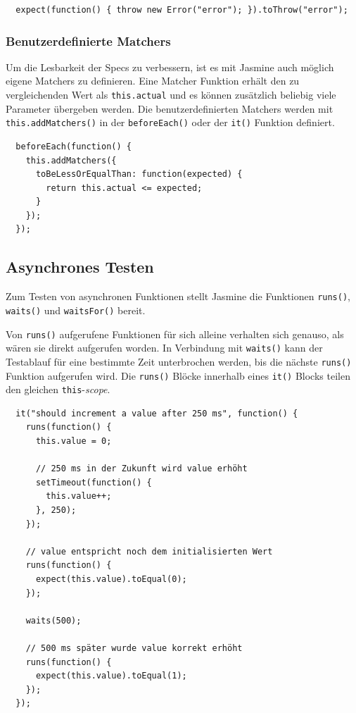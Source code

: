 \documentclass[11pt, a4paper]{article}
\begin{document}
\begin{verbatim}
  expect(function() { throw new Error("error"); }).toThrow("error");
\end{verbatim}

\subsubsection*{Benutzerdefinierte Matchers}

Um die Lesbarkeit der Specs zu verbessern, ist es mit Jasmine auch möglich eigene
Matchers zu definieren. Eine Matcher Funktion erhält den zu vergleichenden Wert
als \texttt{this.actual} und es können zusätzlich beliebig viele Parameter
übergeben werden. Die benutzerdefinierten Matchers werden mit
\texttt{this.addMatchers()} in der \texttt{beforeEach()} oder der \texttt{it()}
Funktion definiert.

\begin{verbatim}
  beforeEach(function() {
    this.addMatchers({
      toBeLessOrEqualThan: function(expected) {
        return this.actual <= expected;
      }
    });
  });
\end{verbatim}

\subsection{Asynchrones Testen}

Zum Testen von asynchronen Funktionen stellt Jasmine die Funktionen
\texttt{runs()}, \texttt{waits()} und \texttt{waitsFor()} bereit.

Von \texttt{runs()} aufgerufene Funktionen für sich alleine verhalten sich
genauso, als wären sie direkt aufgerufen worden. In Verbindung mit
\texttt{waits()} kann der Testablauf für eine bestimmte Zeit unterbrochen
werden, bis die nächste \texttt{runs()} Funktion aufgerufen wird. Die
\texttt{runs()} Blöcke innerhalb eines \texttt{it()} Blocks teilen den gleichen
\texttt{this}-\emph{scope}.

\begin{verbatim}
  it("should increment a value after 250 ms", function() {
    runs(function() {
      this.value = 0;

      // 250 ms in der Zukunft wird value erhöht
      setTimeout(function() {
        this.value++;
      }, 250);
    });

    // value entspricht noch dem initialisierten Wert
    runs(function() {
      expect(this.value).toEqual(0);
    });

    waits(500);

    // 500 ms später wurde value korrekt erhöht
    runs(function() {
      expect(this.value).toEqual(1);
    });
  });
\end{verbatim}
\end{document}
